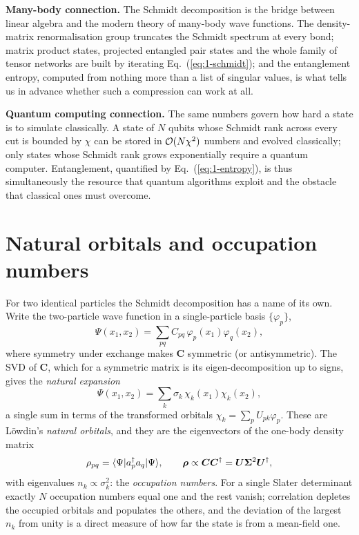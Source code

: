 \begin{notebox}
\textbf{Many-body connection.} The Schmidt decomposition is the bridge
between linear algebra and the modern theory of many-body wave functions.
The density-matrix renormalisation group truncates the Schmidt spectrum at
every bond; matrix product states, projected entangled pair states and the
whole family of tensor networks are built by iterating
Eq.~(\ref{eq:1-schmidt}); and the entanglement entropy, computed from nothing
more than a list of singular values, is what tells us in advance whether such
a compression can work at all.

\textbf{Quantum computing connection.} The same numbers govern how hard a
state is to simulate classically.  A state of $N$ qubits whose Schmidt rank
across every cut is bounded by $\chi$ can be stored in $\mathcal{O}(N\chi^2)$
numbers and evolved classically; only states whose Schmidt rank grows
exponentially require a quantum computer.  Entanglement, quantified by
Eq.~(\ref{eq:1-entropy}), is thus simultaneously the resource that quantum
algorithms exploit and the obstacle that classical ones must overcome.
\end{notebox}

\section{Natural orbitals and occupation numbers}
\label{sec:naturalorbitals}

For two identical particles the Schmidt decomposition has a name of its own.
Write the two-particle wave function in a single-particle basis
$\{\varphi_p\}$,
\begin{equation}
  \Psi(x_1,x_2) = \sum_{pq} C_{pq}\,\varphi_p(x_1)\varphi_q(x_2),
  \label{eq:1-twoparticle}
\end{equation}
where symmetry under exchange makes $\bm{C}$ symmetric (or antisymmetric).
The SVD of $\bm{C}$, which for a symmetric matrix is its eigen-decomposition
up to signs, gives the \emph{natural expansion}
\begin{equation}
  \Psi(x_1,x_2) = \sum_{k}\sigma_k\,\chi_k(x_1)\chi_k(x_2),
  \label{eq:1-naturalexpansion}
\end{equation}
a single sum in terms of the transformed orbitals
$\chi_k=\sum_p U_{pk}\varphi_p$.  These are L\"owdin's \emph{natural
orbitals}, and they are the eigenvectors of the one-body density matrix
\begin{equation}
  \rho_{pq} = \langle \Psi | a^{\dagger}_p a_q | \Psi \rangle,
  \qquad
  \bm{\rho} \propto \bm{C}\bm{C}^{\dagger} = \bm{U}\bm{\Sigma}^2\bm{U}^{\dagger},
  \label{eq:1-onebodydm}
\end{equation}
with eigenvalues $n_k\propto\sigma_k^2$: the \emph{occupation numbers}.  For a
single Slater determinant exactly $N$ occupation numbers equal one and the
rest vanish; correlation depletes the occupied orbitals and populates the
others, and the deviation of the largest $n_k$ from unity is a direct measure
of how far the state is from a mean-field one.

